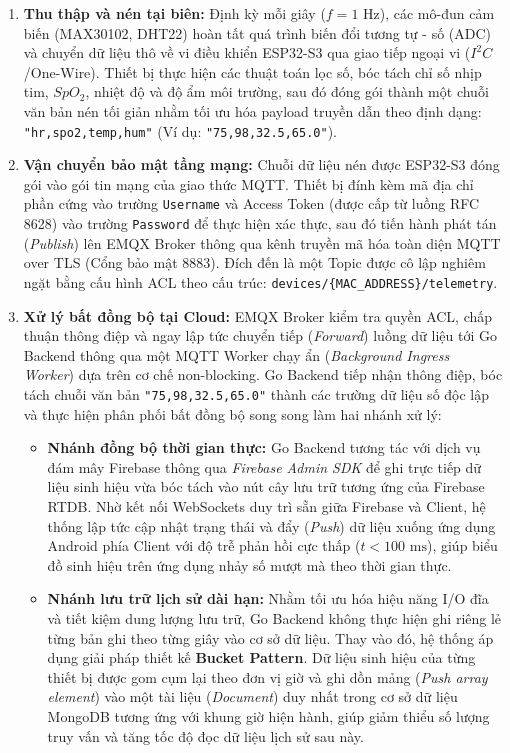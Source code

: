 \documentclass[a4paper,13pt,3p,oneside]{report}
\begin{document}
\begin{enumerate}
    \item \textbf{Thu thập và nén tại biên:} Định kỳ mỗi giây ($f = 1\text{ Hz}$), các mô-đun cảm biến (MAX30102, DHT22) hoàn tất quá trình biến đổi tương tự - số (ADC) và chuyển dữ liệu thô về vi điều khiển ESP32-S3 qua giao tiếp ngoại vi ($I^2C$/One-Wire). Thiết bị thực hiện các thuật toán lọc số, bóc tách chỉ số nhịp tim, $SpO_2$, nhiệt độ và độ ẩm môi trường, sau đó đóng gói thành một chuỗi văn bản nén tối giản nhằm tối ưu hóa payload truyền dẫn theo định dạng: \texttt{"hr,spo2,temp,hum"} (Ví dụ: \texttt{"75,98,32.5,65.0"}).
    
    \item \textbf{Vận chuyển bảo mật tầng mạng:} Chuỗi dữ liệu nén được ESP32-S3 đóng gói vào gói tin mạng của giao thức MQTT. Thiết bị đính kèm mã địa chỉ phần cứng vào trường \texttt{Username} và Access Token (được cấp từ luồng RFC 8628) vào trường \texttt{Password} để thực hiện xác thực, sau đó tiến hành phát tán (\textit{Publish}) lên EMQX Broker thông qua kênh truyền mã hóa toàn diện MQTT over TLS (Cổng bảo mật 8883). Đích đến là một Topic được cô lập nghiêm ngặt bằng cấu hình ACL theo cấu trúc: \texttt{devices/\{MAC\_ADDRESS\}/telemetry}.
    
    \item \textbf{Xử lý bất đồng bộ tại Cloud:} EMQX Broker kiểm tra quyền ACL, chấp thuận thông điệp và ngay lập tức chuyển tiếp (\textit{Forward}) luồng dữ liệu tới Go Backend thông qua một MQTT Worker chạy ẩn (\textit{Background Ingress Worker}) dựa trên cơ chế non-blocking. Go Backend tiếp nhận thông điệp, bóc tách chuỗi văn bản \texttt{"75,98,32.5,65.0"} thành các trường dữ liệu số độc lập và thực hiện phân phối bất đồng bộ song song làm hai nhánh xử lý:
    
    \begin{itemize}
        \item \textbf{Nhánh đồng bộ thời gian thực:} Go Backend tương tác với dịch vụ đám mây Firebase thông qua \textit{Firebase Admin SDK} để ghi trực tiếp dữ liệu sinh hiệu vừa bóc tách vào nút cây lưu trữ tương ứng của Firebase RTDB. Nhờ kết nối WebSockets duy trì sẵn giữa Firebase và Client, hệ thống lập tức cập nhật trạng thái và đẩy (\textit{Push}) dữ liệu xuống ứng dụng Android phía Client với độ trễ phản hồi cực thấp ($t < 100\text{ ms}$), giúp biểu đồ sinh hiệu trên ứng dụng nhảy số mượt mà theo thời gian thực.
        
        \item \textbf{Nhánh lưu trữ lịch sử dài hạn:} Nhằm tối ưu hóa hiệu năng I/O đĩa và tiết kiệm dung lượng lưu trữ, Go Backend không thực hiện ghi riêng lẻ từng bản ghi theo từng giây vào cơ sở dữ liệu. Thay vào đó, hệ thống áp dụng giải pháp thiết kế \textbf{Bucket Pattern}. Dữ liệu sinh hiệu của từng thiết bị được gom cụm lại theo đơn vị giờ và ghi dồn mảng (\textit{Push array element}) vào một tài liệu (\textit{Document}) duy nhất trong cơ sở dữ liệu MongoDB tương ứng với khung giờ hiện hành, giúp giảm thiểu số lượng truy vấn và tăng tốc độ đọc dữ liệu lịch sử sau này.
    \end{itemize}
\end{enumerate}
\end{document}
